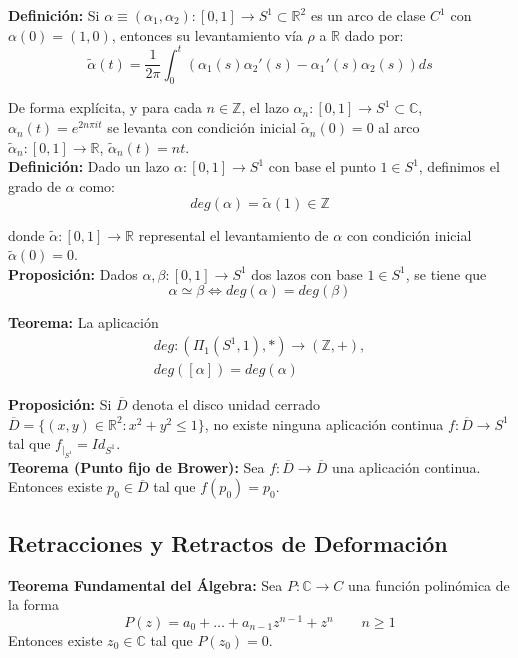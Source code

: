 \documentclass{article}
\begin{document}
\textbf{Definición:} Si $\alpha \equiv (\alpha_1,\alpha_2):[0,1]\rightarrow S^1\subset \mathbb{R}^2$ es un arco de clase $C^1$ con $\alpha(0)=(1,0)$, entonces su levantamiento vía $\rho$ a $\mathbb{R}$ dado por:
\begin{equation*}
\tilde{\alpha}(t)=\frac{1}{2\pi}\int_0^t (\alpha_1(s)\alpha_2'(s)-\alpha_1'(s)\alpha_2(s))ds
\end{equation*}

De forma explícita, y para cada $n\in \mathbb{Z}$, el lazo $\alpha_n:[0,1]\rightarrow S^1\subset \mathbb{C}$, $\alpha_n(t)=e^{2n\pi it}$ se levanta con condición inicial $\tilde{\alpha}_n(0)=0$ al arco $\tilde{\alpha}_n:[0,1]\rightarrow\mathbb{R}$, $\tilde{\alpha}_n(t)=nt$.\\

\textbf{Definición:} Dado un lazo $\alpha:[0,1]\rightarrow S^1$ con base el punto $1\in S^1$, definimos el grado de $\alpha$ como:
\begin{equation*}
deg(\alpha)=\tilde{\alpha}(1)\in \mathbb{Z}
\end{equation*}

donde $\tilde{\alpha}:[0,1]\rightarrow\mathbb{R}$ represental el levantamiento de $\alpha$ con condición inicial $\tilde{\alpha}(0)=0$.\\

\textbf{Proposición:} Dados $\alpha,\beta:[0,1]\rightarrow S^1$ dos lazos con base $1\in S^1$, se tiene que 
\begin{equation*}
\alpha\simeq \beta\Leftrightarrow deg(\alpha)=deg(\beta)
\end{equation*}

\textbf{Teorema:} La aplicación 
\begin{gather*}
deg:(\Pi_1(S^1,1),*)\rightarrow (\mathbb{Z},+),\\
deg([\alpha])=deg(\alpha)
\end{gather*}

\textbf{Proposición:} Si $\overline{D}$ denota el disco unidad cerrado $\overline{D}=\{(x,y)\in \mathbb{R}^2:x^2+y^2\leq 1\}$, no existe ninguna aplicación continua $f:\overline{D}\rightarrow S^1$ tal que $f_{|_{S^1}}=Id_{S^1}$. \\

\textbf{Teorema (Punto fijo de Brower):} Sea $f:\overline{D}\rightarrow \overline{D}$ una aplicación continua. Entonces existe $p_0\in \overline{D}$ tal que $f(p_0)=p_0$. \\

\subsection{Retracciones y Retractos de Deformación}
\textbf{Teorema Fundamental del Álgebra:} Sea $P:\mathbb{C}\rightarrow C$ una función polinómica de la forma
\begin{equation*}
P(z)=a_0+\ldots+a_{n-1}z^{n-1}+z^n\qquad n\geq 1
\end{equation*}
Entonces existe $z_0\in \mathbb{C}$ tal que $P(z_0)=0$.\\
\end{document}
